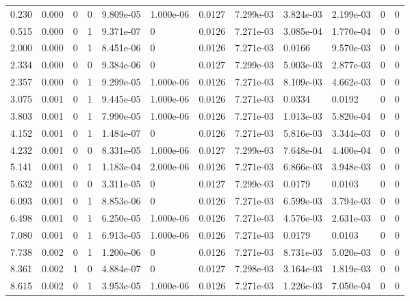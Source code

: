 \documentclass[preview]{standalone}
\begin{document}
{{\begin{tabular}{L{1.2cm}C{1.2cm} C{0.3cm}C{0.5cm} C{1.4cm}C{1.4cm} C{1.4cm}C{1.4cm} C{1.6cm}C{1.6cm} C{1.6cm}C{1.6cm}}
  0.230  &  0.000  & 0     &  0 &  9.809e-05  & 1.000e-06  &  0.0127&   7.299e-03& 3.824e-03 & 2.199e-03   &  0 & 0  \\ 
  0.515  &  0.000  & 0     &  1 &  9.371e-07  & 0  &  0.0126&   7.271e-03& 3.085e-04 & 1.770e-04   &  0 & 0  \\ 
  2.000  &  0.000  & 0     &  1 &  8.451e-06  & 0  &  0.0126&   7.271e-03& 0.0166 & 9.570e-03   &  0 & 0  \\ 
  2.334  &  0.000  & 0     &  0 &  9.384e-06  & 0  &  0.0127&   7.299e-03& 5.003e-03 & 2.877e-03   &  0 & 0  \\ 
  2.357  &  0.000  & 0     &  1 &  9.299e-05  & 1.000e-06  &  0.0126&   7.271e-03& 8.109e-03 & 4.662e-03   &  0 & 0  \\ 
  3.075  &  0.001  & 0     &  1 &  9.445e-05  & 1.000e-06  &  0.0126&   7.271e-03& 0.0334 & 0.0192   &  0 & 0  \\ 
  3.803  &  0.001  & 0     &  1 &  7.990e-05  & 1.000e-06  &  0.0126&   7.271e-03& 1.013e-03 & 5.820e-04   &  0 & 0  \\ 
  4.152  &  0.001  & 0     &  1 &  1.484e-07  & 0  &  0.0126&   7.271e-03& 5.816e-03 & 3.344e-03   &  0 & 0  \\ 
  4.232  &  0.001  & 0     &  0 &  8.331e-05  & 1.000e-06  &  0.0127&   7.299e-03& 7.648e-04 & 4.400e-04   &  0 & 0  \\ 
  5.141  &  0.001  & 0     &  1 &  1.183e-04  & 2.000e-06  &  0.0126&   7.271e-03& 6.866e-03 & 3.948e-03   &  0 & 0  \\ 
  5.632  &  0.001  & 0     &  0 &  3.311e-05  & 0  &  0.0127&   7.299e-03& 0.0179 & 0.0103   &  0 & 0  \\ 
  6.093  &  0.001  & 0     &  1 &  8.853e-06  & 0  &  0.0126&   7.271e-03& 6.599e-03 & 3.794e-03   &  0 & 0  \\ 
  6.498  &  0.001  & 0     &  1 &  6.250e-05  & 1.000e-06  &  0.0126&   7.271e-03& 4.576e-03 & 2.631e-03   &  0 & 0  \\ 
  7.080  &  0.001  & 0     &  1 &  6.913e-05  & 1.000e-06  &  0.0126&   7.271e-03& 0.0179 & 0.0103   &  0 & 0  \\ 
  7.738  &  0.002  & 0     &  1 &  1.200e-06  & 0  &  0.0126&   7.271e-03& 8.731e-03 & 5.020e-03   &  0 & 0  \\ 
  8.361  &  0.002  & 1     &  0 &  4.884e-07  & 0  &  0.0127&   7.298e-03& 3.164e-03 & 1.819e-03   &  0 & 0  \\ 
  8.615  &  0.002  & 0     &  1 &  3.953e-05  & 1.000e-06  &  0.0126&   7.271e-03& 1.226e-03 & 7.050e-04   &  0 & 0  \\ 

\end{tabular}}}
\end{document}
